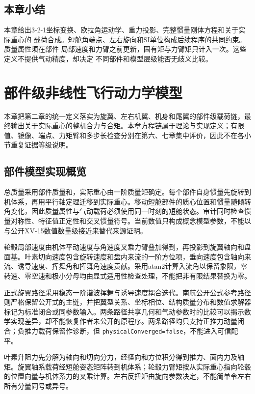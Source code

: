 \documentclass[UTF8,12pt,oneside,openany,fontset=windows]{ctexbook}
\begin{document}
\section{本章小结}

本章给出3-2-1坐标变换、欧拉角运动学、重力投影、完整惯量刚体方程和关于实际重心的 载荷合成。短舱角端点、左右旋向和SI单位构成后续程序的共同约束。质量属性须在部件 局部速度和力臂之前更新，固有矩与力臂矩只计入一次。这些定义不提供气动精度，却决定 不同部件和模型层级能否无歧义比较。

\chapter{部件级非线性飞行动力学模型}

本章把第二章的统一定义落实为旋翼、左右机翼、机身和尾翼的部件级载荷链，最终输出关于实际重心的整机合力与合矩。本章方程链属于理论与实现定义；有限值、镜像、端点、力矩臂和多步长检查分别在第六、七章集中评价，因此不在各小节重复证据等级说明。

\section{部件模型实现概览}

总质量采用部件质量和，实际重心由一阶质量矩确定。每个部件自身惯量先旋转到机体系，再用平行轴定理迁移到实际重心。移动短舱部件的质心位置和惯量随倾转角变化，因此质量属性与气动载荷必须使用同一时刻的短舱状态。审计同时检查惯量对称性、特征值正定性和交叉惯量符号。当前数值只构成概念模型参数，不能以与公开XV-15数值数量级接近来替代来源证明。

轮毂局部速度由机体平动速度与角速度叉乘力臂叠加得到，再投影到旋翼轴向和盘面基。叶素切向速度包含旋转速度和盘内来流的一阶方位项，垂向速度包含轴向来流、诱导速度、挥舞角和挥舞角速度贡献。采用atan2计算入流角以保留象限，零转速、零空速和极小分母均由显式适用性检查处理，不能把非有限结果替换为零。

正式旋翼路径采用稳态一阶谐波挥舞与诱导速度耦合迭代。南航公开公式参考路径则严格保留公开式的主链，并把翼型关系、坐标相位、结构质量分布和数值求解器标记为标准闭合或同参数输入。两条路径共享几何和气动参数时的比较可以揭示数学实现差异，却不能恢复作者未公开的原程序。两条路径均只支持正推力动量闭合；负推力载荷保留作诊断，但 \texttt{physicalConverged=false}，不能进入可信配平。

叶素升阻力先分解为轴向和切向分力，经径向和方位积分得到推力、面内力及轴矩。旋翼轴系载荷经短舱姿态矩阵转到机体系；轮毂力臂矩按从实际重心指向轮毂的位置向量与机体系力的叉乘计算。左右反扭矩由旋向参数决定，不能简单令左右所有分量同号或异号。
\end{document}
